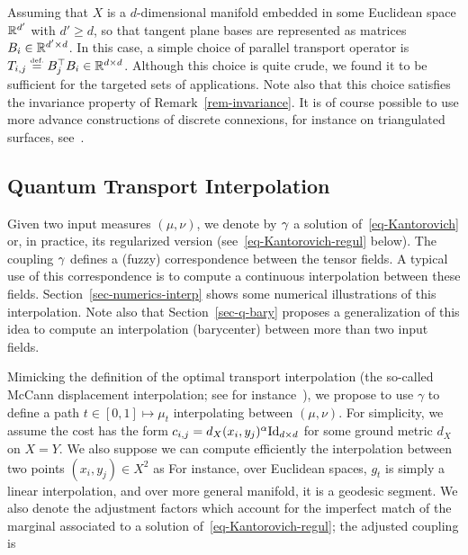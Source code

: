 \begin{rem}
	Assuming that $X$ is a $d$-dimensional manifold embedded in some Euclidean space $\mathbb{R}^{d'}$ with $d' \geq d$, so that tangent plane bases are represented as matrices $B_i \in \mathbb{R}^{d' \times d}$. In this case, a simple choice of parallel transport operator is $T_{i,j} \eqdef B_j^\top B_i \in \RR^{d \times d}$. Although this choice is quite crude, we found it to be sufficient for the targeted sets of applications. Note also that this choice satisfies the invariance property of Remark~\ref{rem-invariance}. It is of course possible to use more advance constructions of discrete connexions, for instance on triangulated surfaces, see~\cite{crane2010trivial,liu2016discrete}.
\end{rem}

\fi

\subsection{Quantum Transport Interpolation}

\newcommand{\muA}{\mu}
\newcommand{\muB}{\nu}


Given two input measures $(\muA,\muB)$, we denote by $\gamma$ a solution of~\eqref{eq-Kantorovich} or, in practice, its regularized version (see~\eqref{eq-Kantorovich-regul} below). The coupling $\gamma$ defines a (fuzzy) correspondence between the tensor fields. A typical use of this correspondence is to compute a continuous interpolation between these fields. Section~\ref{sec-numerics-interp} shows some numerical illustrations of this interpolation. Note also that Section~\ref{sec-q-bary} proposes a generalization of this idea to compute an interpolation (barycenter) between more than two input fields.  


Mimicking the definition of the optimal transport interpolation (the so-called McCann displacement interpolation; see for instance~\cite{santambrogio2015optimal}), we propose to use $\gamma$ to define a path $t \in [0,1] \mapsto \mu_t$ interpolating between $(\muA,\muB)$. 
%
For simplicity, we assume the cost has the form $c_{i,j}=d_X(x_i,y_j)^\alpha \mathrm{Id}_{d \times d}$ for some ground metric $d_X$ on $X=Y$. We also suppose we can compute efficiently the interpolation between two points $(x_i,y_j) \in X^2$ as
For instance, over Euclidean spaces, $g_t$ is simply a linear interpolation, and over more general manifold, it is a geodesic segment.
We also denote
\eq{
	\bar\muA_i \eqdef \muA_i \Big( \sum_{j} \ga_{i,j} \Big)^{-1} 
	\qandq
	\bar\muB_j \eqdef \muB_j \Big( \sum_{i} \ga_{i,j} \Big)^{-1}
}
the adjustment factors which account for the imperfect match of the marginal associated to a solution of~\eqref{eq-Kantorovich-regul}; the adjusted coupling is
\eq{
	\ga_{i,j}^t \eqdef [(1-t) \bar\muA_i + t \bar\muB_{j}] \ga_{i,j}.
}

